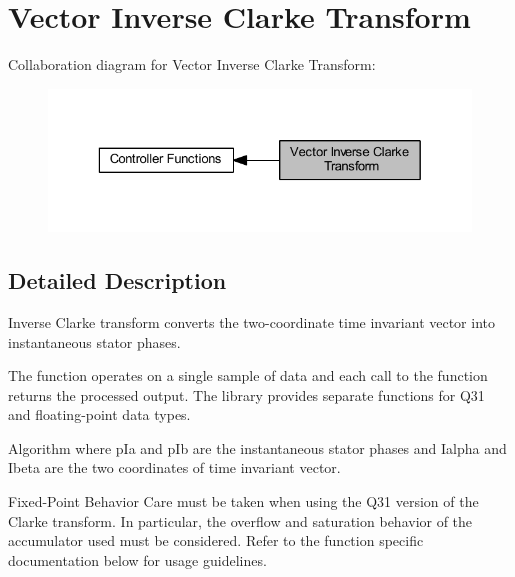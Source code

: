 \hypertarget{group__inv__clarke}{}\section{Vector Inverse Clarke Transform}
\label{group__inv__clarke}
Collaboration diagram for Vector Inverse Clarke Transform\+:
\nopagebreak
\begin{figure}[H]
\begin{center}
\leavevmode
\includegraphics[width=329pt]{group__inv__clarke}
\end{center}
\end{figure}


\subsection{Detailed Description}
Inverse Clarke transform converts the two-\/coordinate time invariant vector into instantaneous stator phases.

The function operates on a single sample of data and each call to the function returns the processed output. The library provides separate functions for Q31 and floating-\/point data types. \begin{DoxyParagraph}{Algorithm}
 where {\ttfamily p\+Ia} and {\ttfamily p\+Ib} are the instantaneous stator phases and {\ttfamily Ialpha} and {\ttfamily Ibeta} are the two coordinates of time invariant vector. 
\end{DoxyParagraph}
\begin{DoxyParagraph}{Fixed-\/\+Point Behavior}
Care must be taken when using the Q31 version of the Clarke transform. In particular, the overflow and saturation behavior of the accumulator used must be considered. Refer to the function specific documentation below for usage guidelines. 
\end{DoxyParagraph}
